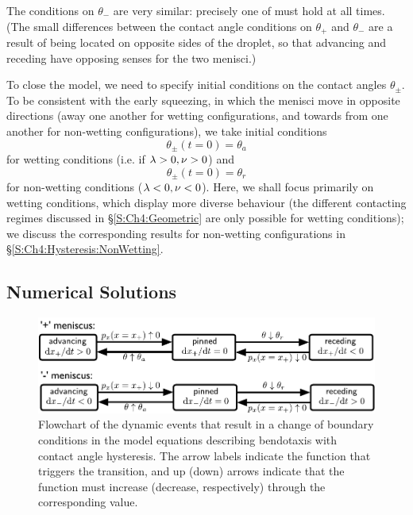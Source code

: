 The conditions on $\theta_-$ are very similar: precisely one of
\renewcommand*{\arraystretch}{1.3}
must hold at all times. (The small differences between the contact angle conditions on $\theta_+$ and $\theta_-$ are a result of being located on opposite sides of the droplet, so that advancing and receding have opposing senses for the two menisci.)

To close the model, we need to specify initial conditions on the contact angles $\theta_\pm$. To be consistent with the early squeezing, in which the menisci move in opposite directions (away one another for wetting configurations, and towards from one another for non-wetting configurations), we take initial conditions
\begin{equation}\label{E:ch4:Hysteresis:Parametrisation:ic_theta_wetting}
\theta_{\pm}(t = 0) = \theta_a
\end{equation}
for wetting conditions (i.e. if $\lambda > 0, \nu >0$) and
\begin{equation}
\theta_{\pm}(t = 0) = \theta_r
\end{equation}
for non-wetting conditions ($\lambda < 0, \nu <0$). Here, we shall focus primarily on wetting conditions, which display more diverse behaviour (the different contacting regimes discussed in \S\ref{S:Ch4:Geometric} are only possible for wetting conditions); we discuss the corresponding results for non-wetting configurations in \S\ref{S:Ch4:Hysteresis:NonWetting}.

\subsection{Numerical Solutions}\label{S:Ch4:Hysteresis:Numerics}

\begin{figure}[t]
\includegraphics[scale = 0.97]{transitions_contact_angles}
\caption{Flowchart of the dynamic events that result in a change of boundary conditions in the model equations describing bendotaxis with contact angle hysteresis. The arrow labels indicate the function that triggers the transition, and up (down) arrows indicate that the function must increase (decrease, respectively) through the corresponding value.}\label{fig:Ch4:Hysteresis:Flowchart}
\end{figure}


